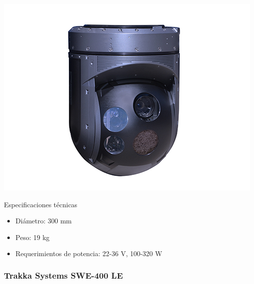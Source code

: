 \noindent\begin{minipage}{0.3\textwidth}%
	\includegraphics[width=\linewidth]{imagenes/TC-300}
\end{minipage}%
\hfill%
\begin{minipage}{0.7\textwidth}
	Especificaciones técnicas
	\begin{itemize}
		\item Diámetro: 300 mm
		\item Peso: 19 kg
		\item Requerimientos de potencia: 22-36 V, 100-320 W
	\end{itemize}
\end{minipage}

\subsubsection*{Trakka Systems SWE-400 LE}

